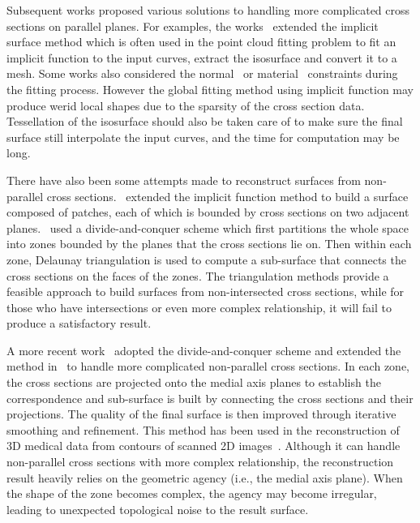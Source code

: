 Subsequent  works proposed various solutions to handling more
complicated cross sections on parallel planes. For examples, the
works~\cite{HZB92, CNKG02, TO99} extended the implicit surface
method which is often used in the point cloud fitting problem to fit
an implicit function to the input curves, extract the isosurface and
convert it to a mesh. Some works also considered the
normal~\cite{BMSdV10} or material~\cite{WD00} constraints during the
fitting process. However the global fitting method using implicit
function may produce werid local shapes due to the sparsity of the
cross section data. Tessellation of the isosurface should also be
taken care of to make sure the final surface still interpolate the
input curves, and the time for computation may be long.

There have also  been some attempts made to reconstruct surfaces
from non-parallel cross sections.~\cite{RU90, WMTBDC95, BTS04}
extended the implicit function method to build a surface composed
of patches, each of which is bounded by cross sections on two
adjacent planes.~\cite{PT94,DP97,BM07} used a divide-and-conquer
scheme which first partitions the whole space into zones bounded by
the planes that the cross sections lie on. Then within each zone,
Delaunay triangulation is used to compute a sub-surface that
connects the cross sections on the faces of the zones. The
triangulation methods provide a feasible approach to build surfaces
from non-intersected cross sections, while for those who have
intersections or even more complex relationship, it will fail to
produce a satisfactory result.

A more recent  work~\cite{LBDLJ08}  adopted the divide-and-conquer
scheme and extended the method in~\cite{JWCET05} to handle more
complicated non-parallel cross sections. In each zone, the cross
sections are projected onto the medial axis planes to establish the
correspondence and sub-surface is built by connecting the cross
sections and their projections. The quality of the final surface is
then improved through iterative smoothing and refinement. This
method has been used in the reconstruction of 3D medical data from
contours of scanned 2D images~\cite{SLJGAGL09}. Although it can
handle non-parallel cross sections with more complex relationship,
the reconstruction result heavily relies on the geometric agency
(i.e., the medial axis plane). When the shape of the zone becomes
complex, the agency may become irregular, leading to unexpected
topological noise to the result surface.

